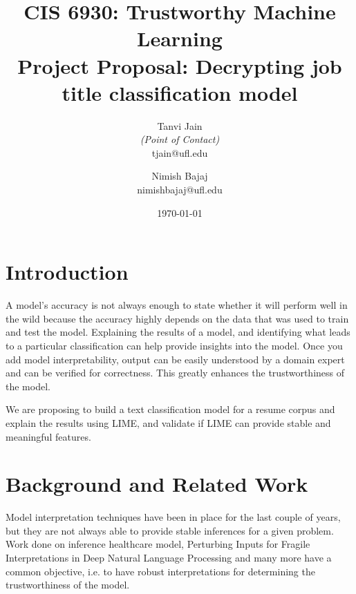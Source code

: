 \documentclass[11pt,letterpaper]{article}
\title{CIS 6930: Trustworthy Machine Learning\\
	\Large Project Proposal: Decrypting job title classification model} %
\author{
        Tanvi Jain \\{\em (Point of Contact)} \\
        tjain@ufl.edu\\
        \and
        Nimish Bajaj \\
        nimishbajaj@ufl.edu\\
}
\date{\today}
\begin{document}

\maketitle




\section{Introduction}



A model's accuracy is not always enough to state whether it will perform well in the wild because the accuracy highly depends on the data that was used to train and test the model. 
Explaining the results of a model, and identifying what leads to a particular classification can help provide insights into the model.
Once you add model interpretability, output can be easily understood by a domain expert and can be verified for correctness. This greatly enhances the trustworthiness of the model.


We are proposing to build a text classification model for a resume corpus and explain the results using LIME, and validate if LIME can provide stable and meaningful features. 

\section{Background and Related Work}

Model interpretation techniques have been in place for the last couple of years, but they are not always able to provide stable inferences for a given problem. 
Work done on inference healthcare model\cite{Rasheed2021}, Perturbing Inputs for Fragile Interpretations in Deep Natural Language Processing \cite{sinha2021perturbing} and many more have a common objective, i.e. to have robust interpretations for determining the trustworthiness of the model.
\end{document}
